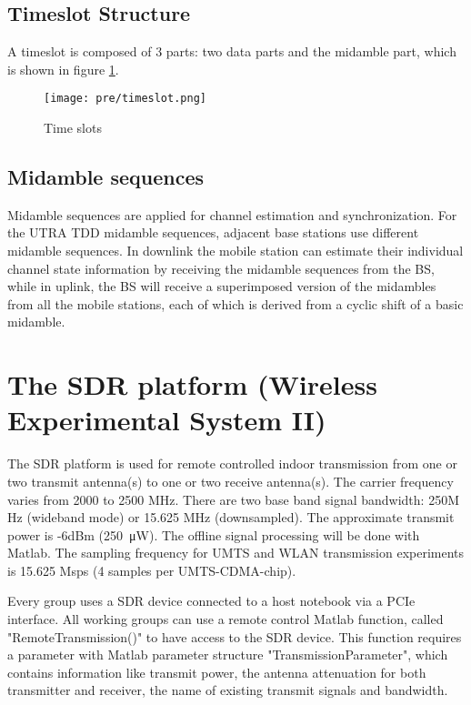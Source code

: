 \subsection{Timeslot Structure}
A timeslot is composed of 3 parts: two data parts and the midamble part, which is shown in figure \ref{fig:pre:timeslot}.
\begin{figure}[H]
	\begin{center}
		\texttt{[image: pre/timeslot.png]}
		\caption{Time slots \cite{e1}}
		\label{fig:pre:timeslot}
	\end{center}
\end{figure}

\subsection{Midamble sequences}
Midamble sequences are applied for channel estimation and synchronization. For the UTRA TDD midamble sequences, adjacent base stations use different midamble sequences. In downlink the mobile station can estimate their individual channel state information by receiving the midamble sequences from the BS, while in uplink, the BS will receive a superimposed version of the midambles from all the mobile stations, each of which is derived from a cyclic shift of a basic midamble.

\section{The SDR platform (Wireless Experimental System II)}
The SDR platform is used for remote controlled indoor transmission from one or two transmit antenna(s) to one or two receive antenna(s). The carrier frequency varies from 2000 to 2500 MHz. There are two base band signal bandwidth: 250M Hz (wideband mode) or 15.625 MHz (downsampled). The approximate transmit power is -6dBm (\SI{250}{\micro \watt}). The offline signal processing will be done with Matlab. The sampling frequency for UMTS and WLAN transmission experiments is 15.625 Msps (4 samples per UMTS-CDMA-chip).

Every group uses a SDR device connected to a host notebook via a PCIe interface. All working groups can use a remote control Matlab function, called "RemoteTransmission()" to have access to the SDR device.  This function requires a parameter with Matlab parameter structure "TransmissionParameter", which contains information like transmit power, the antenna attenuation for both transmitter and receiver, the name of existing transmit signals and bandwidth.

